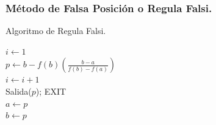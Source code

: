 \documentclass{beamer}
\begin{document}
 \begin{frame}
    \frametitle{M\'etodo de Falsa Posici\'on o Regula Falsi.}
    \small{
\begin{algorithm}[H]
  \caption{Algoritmo de Regula Falsi.}
  $i \leftarrow 1$\\
  {
   $\displaystyle p \leftarrow b - f(b)\left(\frac{b-a}{f(b)-f(a)}\right)$\\
   $i \leftarrow i +1$\\
   {
     Salida($p$); EXIT\\
   }
   {
      $a \leftarrow p$\\
   }
   {
     $b \leftarrow p$\\
   }
  }
  \label{RF_alg}
\end{algorithm}}
\end{frame}
\end{document}
